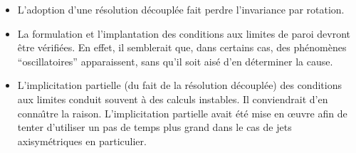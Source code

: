 \begin{itemize}
\item L'adoption d'une résolution découplée fait perdre l'invariance par rotation.
\item La formulation et l'implantation des conditions aux limites de paroi
devront être vérifiées. En effet, il semblerait que, dans certains cas, des phénomènes
``oscillatoires'' apparaissent, sans qu'il soit aisé d'en déterminer la cause.
\item L'implicitation partielle (du fait de la résolution découplée) des
conditions aux limites conduit souvent à des calculs instables. Il
conviendrait d'en conna\^\i tre la raison. L'implicitation partielle avait
été mise en \oe uvre afin de tenter d'utiliser un pas de temps plus grand
dans le cas de jets axisymétriques en particulier.

\end{itemize}
